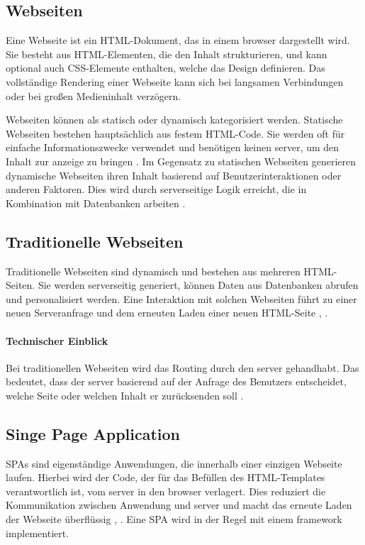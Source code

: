 \subsection{Webseiten}
Eine Webseite ist ein \ac{HTML}-Dokument, das in einem \gls{browser} dargestellt wird.
Sie besteht aus \ac{HTML}-Elementen, die den Inhalt strukturieren, und kann optional auch \ac{CSS}-Elemente enthalten, welche das Design definieren.
Das vollständige Rendering einer Webseite kann sich bei langsamen Verbindungen oder bei großen Medieninhalt verzögern.

Webseiten können als statisch oder dynamisch kategorisiert werden.
Statische Webseiten bestehen hauptsächlich aus festem HTML-Code.
Sie werden oft für einfache Informationszwecke verwendet und benötigen keinen \gls{server}, um den Inhalt zur anzeige zu bringen \cite{Robbins2018}.
Im Gegensatz zu statischen Webseiten generieren dynamische Webseiten ihren Inhalt basierend auf Benutzerinteraktionen oder anderen Faktoren.
Dies wird durch serverseitige Logik erreicht, die in Kombination mit Datenbanken arbeiten \cite{Robbins2018}.

\subsection{Traditionelle Webseiten}
Traditionelle Webseiten sind dynamisch und bestehen aus mehreren \ac{HTML}-Seiten.
Sie werden serverseitig generiert, können Daten aus Datenbanken abrufen und personalisiert werden.
Eine Interaktion mit solchen Webseiten führt zu einer neuen Serveranfrage und dem erneuten Laden einer neuen \ac{HTML}-Seite \cite{Robbins2018}, \cite{Scott2015}.

\paragraph*{Technischer Einblick}
Bei traditionellen Webseiten wird das Routing durch den \gls{server} gehandhabt.
Das bedeutet, dass der \gls{server} basierend auf der Anfrage des Benutzers entscheidet, welche Seite oder welchen Inhalt er zurücksenden soll \cite{Robbins2018}.

\subsection{Singe Page Application}
\ac{SPA}s sind eigenständige Anwendungen, die innerhalb einer einzigen Webseite laufen.
Hierbei wird der Code, der für das Befüllen des \ac{HTML}-Templates verantwortlich ist, vom \gls{server} in den \gls{browser} verlagert.
Dies reduziert die Kommunikation zwischen Anwendung und \gls{server} und macht das erneute Laden der Webseite überflüssig \cite{Flanagan2011}, \cite{Doguhan2020}.
Eine \ac{SPA} wird in der Regel mit einem \gls{framework} implementiert.

